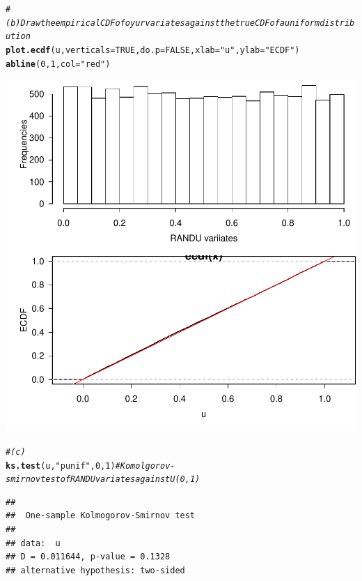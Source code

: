 \documentclass{article}\usepackage[]{graphicx}\usepackage[]{color}
\makeatletter
\newcommand{\hlnum}[1]{\textcolor[rgb]{0.686,0.059,0.569}{#1}}%
\newcommand{\hlstr}[1]{\textcolor[rgb]{0.192,0.494,0.8}{#1}}%
\newcommand{\hlcom}[1]{\textcolor[rgb]{0.678,0.584,0.686}{\textit{#1}}}%
\newcommand{\hlstd}[1]{\textcolor[rgb]{0.345,0.345,0.345}{#1}}%
\newcommand{\hlkwc}[1]{\textcolor[rgb]{0.333,0.667,0.333}{#1}}%
\newcommand{\hlkwd}[1]{\textcolor[rgb]{0.737,0.353,0.396}{\textbf{#1}}}%
\newenvironment{kframe}{%
 \def\at@end@of@kframe{}%
 \ifinner\ifhmode%
  \def\at@end@of@kframe{\end{minipage}}%
  \begin{minipage}{\columnwidth}%
 \fi\fi%
 \def\FrameCommand##1{\hskip\@totalleftmargin \hskip-\fboxsep
 \colorbox{shadecolor}{##1}\hskip-\fboxsep
     \hskip-\linewidth \hskip-\@totalleftmargin \hskip\columnwidth}%
 \MakeFramed {\advance\hsize-\width
   \@totalleftmargin\z@ \linewidth\hsize
   \@setminipage}}%
 {\par\unskip\endMakeFramed%
 \at@end@of@kframe}
\newenvironment{knitrout}{}{} %
\makeatother
\begin{document}
\begin{knitrout}
\begin{kframe}
\begin{alltt}
\hlcom{#(b) Draw the empirical CDF of oyur variates against the true CDF of a uniform distribution}
\hlkwd{plot.ecdf}\hlstd{(u,} \hlkwc{verticals} \hlstd{=} \hlnum{TRUE}\hlstd{,} \hlkwc{do.p} \hlstd{=} \hlnum{FALSE}\hlstd{,} \hlkwc{xlab} \hlstd{=} \hlstr{"u"}\hlstd{,} \hlkwc{ylab} \hlstd{=} \hlstr{"ECDF"}\hlstd{)}
\hlkwd{abline}\hlstd{(}\hlnum{0}\hlstd{,}\hlnum{1}\hlstd{,} \hlkwc{col}\hlstd{=}\hlstr{"red"}\hlstd{)}
\end{alltt}
\end{kframe}

{\centering \includegraphics[width=.6\linewidth]{figure/FinalLab-Rnwunnamed-chunk-3-1} 

}


\begin{kframe}\begin{alltt}
\hlcom{#(c)}
\hlkwd{ks.test}\hlstd{(u,} \hlstr{"punif"}\hlstd{,} \hlnum{0}\hlstd{,} \hlnum{1}\hlstd{)} \hlcom{#Komolgorov-smirnov test of RANDU variates against U(0,1)}
\end{alltt}


{\ttfamily\noindent{}}\begin{verbatim}
## 
## 	One-sample Kolmogorov-Smirnov test
## 
## data:  u
## D = 0.011644, p-value = 0.1328
## alternative hypothesis: two-sided
\end{verbatim}
\end{kframe}
\end{knitrout}
\end{document}
